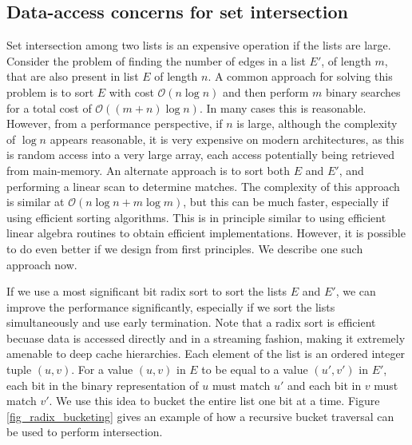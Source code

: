 \subsection{Data-access concerns for set intersection}
Set intersection among two lists is an expensive operation if the lists are large. Consider the problem of finding the number of edges in a list $E'$, of length $m$,  that are also present in list $E$ of length $n$. A common approach for solving this problem is to sort $E$ with cost $\mathcal{O}(n\log n)$ and then perform $m$ binary searches for a total cost of $\mathcal{O}((m+n)\log n)$. In many cases this is reasonable. However, from a performance perspective, if $n$ is large, although the complexity of $\log n$ appears reasonable, it is very expensive on modern architectures, as this is random access into a very large array, each access potentially being retrieved from main-memory. An alternate approach is to sort both $E$ and $E'$, and performing a linear scan to determine matches. The complexity of this approach is similar at $\mathcal{O}(n\log n + m\log m)$, but this can be much faster, especially if using efficient sorting algorithms. This is in principle similar to using efficient linear algebra routines to obtain efficient implementations. However, it is possible to do even better if we design from first principles. We describe one such approach now.  

If we use a most significant bit radix sort to sort the lists $E$ and $E'$, we can improve the performance significantly, especially if we sort the lists simultaneously and use early termination. Note that a radix sort is efficient becuase data is accessed directly and in a streaming fashion, making it extremely amenable to deep cache hierarchies.   
Each element of the list is an ordered integer tuple $(u,v)$. For a value $(u,v)$ in $E$ to be equal to a value $(u',v')$ in $E'$, each bit in the binary representation of $u$ must match $u'$ and each bit in $v$ must match $v'$. We use this idea to bucket the entire list one bit at a time. Figure \ref{fig_radix_bucketing} gives an example of how a recursive bucket traversal can be used to perform intersection.

